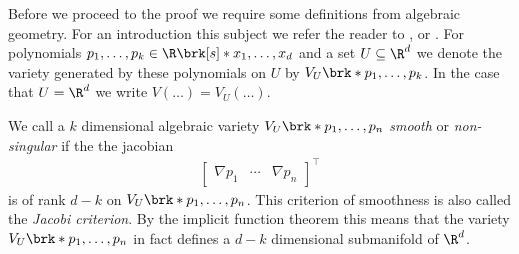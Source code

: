 Before we proceed to the proof we require some definitions from algebraic geometry.
For an introduction this subject we refer the reader to \cite{Gathmann2023}, \cite{Harris1992} or \cite{Hartshorne1977}.
For polynomials $p_1,\dots,p_k\in\R\brk[s]*{x_1,\dots,x_d}$ and a set $U\subseteq\R^d$ we denote the
variety generated by these polynomials on $U$ by $V_U\brk*{p_1,\dots,p_k}$.
In the case that $U=\R^d$ we write $V(\dots)=V_U(\dots)$.
\begin{definition}
  We call a $k$ dimensional algebraic variety $V_U\brk*{p_1,\dots,p_n}$ \emph{smooth} or \emph{non-singular}
  if the the jacobian
  \begin{align*}
    \begin{bmatrix}
      \nabla p_1 & \cdots & \nabla p_n
    \end{bmatrix}^\top
  \end{align*}
  is of rank $d-k$ on $V_U\brk*{p_1,\dots,p_n}$. This criterion of smoothness is also called the
  \emph{Jacobi criterion}. By the implicit function theorem this means that the variety $V_U\brk*{p_1,\dots,p_n}$
  in fact defines a $d-k$ dimensional submanifold of $\R^d$.
\end{definition}

